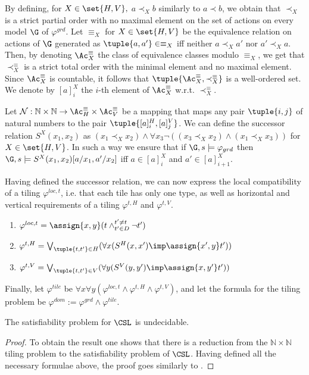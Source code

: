  By defining, for $X\in \set{H,V},$ $a\prec_X b$  similarly to $a\prec b$, we obtain that $\prec_X$ is a strict partial order with no maximal element on the set of actions on every model $\G$ of $\varphi^{grd}$. Let $\equiv_X$ for $X\in \set{H,V}$ be the equivalence relation on actions of $\G$ generated as $\tuple{a,a'}\in \equiv_X$ iff neither $a \prec_X a'$ nor $a'\prec_X a$. Then, by denoting $\Ac^\equiv_X$ the class of equivalence classes modulo $\equiv_X$, we get that $\prec^\equiv_X$ is a strict total order with the minimal element and no maximal element. Since $\Ac^\equiv_X$ is countable, it follows that $\tuple{\Ac^\equiv_X,\prec^\equiv_X}$ is a well-ordered set. We denote by $[a]^X_i$ the $i$-th element of $\Ac^\equiv_X$ w.r.t. $\prec^\equiv_X$. 
 
 Let $\mathcal{N}: \mathbb{N}\times \mathbb{N} \to \Ac^\equiv_H \times \Ac^\equiv_V$ be a mapping that maps any pair $\tuple{i,j}$ of natural numbers to the pair $\tuple{[a]^H_i, [a]^V_j}$.  
 We can define the successor relation %
 $S^X(x_1,x_2)$ as $(x_1 \prec_X x_2) \land \forall x_3 \neg((x_3 \prec_X x_2) \land (x_1 \prec_X x_3))$
 for $X\in \set{H,V}$. In such a way we ensure that if $\G,s\models \varphi_{grd}$ then $\G,s\models S^X(x_1,x_2)[a/x_1,a'/x_2]$ iff $a\in [a]^X_i$ and $a'\in [a]^X_{i+1}$. 
 
 Having defined the successor relation, we can now express the local compatibility of a tiling  $\varphi^{loc,t}$, i.e. that each tile has only one type, as well as horizontal and vertical requirements of a tiling $\varphi^{t,H}$ and $\varphi^{t,V}$.

 \begin{enumerate}
     \item $\varphi^{loc,t}= \assign{x,y}(t\land^{t'\neq t}_{t'\in D} \neg t')$
     \item $\varphi^{t,H}= \bigvee_{\tuple{t,t'}\in H} (\forall x (S^H (x,x') \imp \assign{x',y} t'))$
     \item $\varphi^{t,V}= \bigvee_{\tuple{t,t'}\in V} ( \forall y (S^V (y,y') \imp \assign{x,y'} t'))$
 \end{enumerate}

 Finally, let $\varphi^{tile}$ be $\forall x \forall y ( \varphi^{loc,t} \land \varphi^{t,H} \land \varphi^{t,V})$, and let the formula for the tiling problem be $\varphi^{dom}:= \varphi^{grd} \land \varphi^{tile}$. 

\begin{theorem} The satisfiability problem for $\CSL$ is undecidable. 
\begin{proof}
    To obtain the result one shows that there is a reduction from  the $\mathbb{N}\times \mathbb{N}$ tiling problem to the satisfiability problem of $\CSL$. Having defined all the necessary formulae above, the proof goes similarly to \cite[Theorem 3.10]{mogavero16}.
\end{proof}
    
\end{theorem}